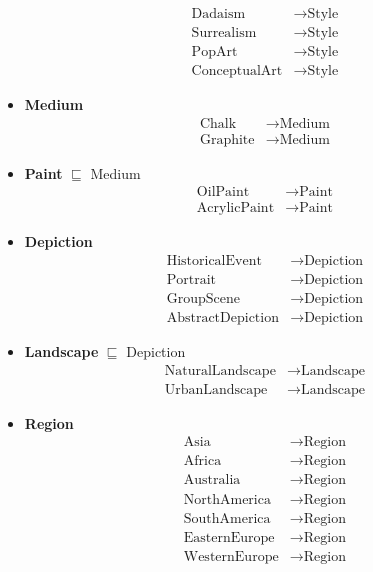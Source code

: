 \documentclass[a4paper, 11pt]{article}
\begin{document}
\begin{itemize}
\begin{align*}
      \text{Dadaism} &\to \text{Style}\\
      \text{Surrealism} &\to \text{Style}\\
      \text{PopArt} &\to \text{Style}\\
      \text{ConceptualArt} &\to \text{Style}
    \end{align*}
  \item \textbf{Medium}
    \begin{align*}
      \text{Chalk} &\to \text{Medium}\\
      \text{Graphite} &\to \text{Medium}
    \end{align*}
  \item \textbf{Paint} $\sqsubseteq$ Medium
    \begin{align*}
      \text{OilPaint} &\to \text{Paint}\\
      \text{AcrylicPaint} &\to \text{Paint}
    \end{align*}
  \item \textbf{Depiction}
    \begin{align*}
      \text{HistoricalEvent} &\to \text{Depiction}\\
      \text{Portrait} &\to \text{Depiction}\\
      \text{GroupScene} &\to \text{Depiction}\\
      \text{AbstractDepiction} &\to \text{Depiction}
    \end{align*}
  \item \textbf{Landscape} $\sqsubseteq$ Depiction
    \begin{align*}
      \text{NaturalLandscape} &\to \text{Landscape}\\
      \text{UrbanLandscape} &\to \text{Landscape}
    \end{align*}
  \item \textbf{Region}
    \begin{align*}
      \text{Asia} &\to \text{Region}\\
      \text{Africa} &\to \text{Region}\\
      \text{Australia} &\to \text{Region}\\
      \text{NorthAmerica} &\to \text{Region}\\
      \text{SouthAmerica} &\to \text{Region}\\
      \text{EasternEurope} &\to \text{Region}\\
      \text{WesternEurope} &\to \text{Region}
    \end{align*}
\end{itemize}
\end{document}

